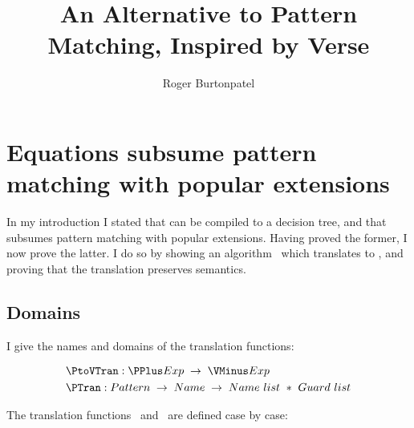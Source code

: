 \documentclass[manuscript,screen,review, 12pt, nonacm]{acmart}
\title{An Alternative to Pattern Matching, Inspired by Verse}
\author{Roger Burtonpatel}
\affiliation{%
\institution{Tufts University}
\streetaddress{419 Boston Ave}
  \city{Medford}
  \state{Massachusetts}
  \country{USA}
  \postcode{02155}
  }
\begin{document}
\section{Equations subsume pattern matching with popular extensions}
\label{pplustovminus}
    In my introduction I stated that \VMinus can be compiled to a decision
    tree, and that \VMinus subsumes pattern matching with popular extensions.
    Having proved the former, I now prove the latter. I do so by showing an
    algorithm \PtoVTran\ which translates \PPlus to \VMinus, and proving that
    the translation preserves semantics. 

    \subsection{Domains}

    I give the names and domains of the translation functions: 
    
    \begin{align*}
        &\PtoVTran: \PPlus Exp\; \rightarrow\; \VMinus Exp \\
        &\PTran: Pattern\; \rightarrow\; Name\; \rightarrow\; Name\ list\ *\ Guard\ list \\
    \end{align*}
    
    The translation functions \PtoVTran\ and \PTran\ are defined case by case: 
    
    
        
\end{document}
